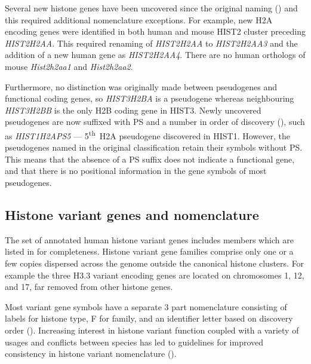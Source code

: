     Several new histone genes have been uncovered since the original
    naming ()
    and this required additional nomenclature exceptions.
    For example, new H2A encoding genes were identified in both human
    and mouse HIST2 cluster preceding \textit{HIST2H2AA}.
    This required renaming of \textit{HIST2H2AA} to \textit{HIST2H2AA3}
    and the addition of a new human gene as \textit{HIST2H2AA4}.
    There are no human orthologs of mouse \textit{Hist2h2aa1} and \textit{Hist2h2aa2}.

    Furthermore, no distinction was originally made between
    pseudogenes and functional coding genes,
    so \textit{HIST3H2BA} is a pseudogene whereas neighbouring
    \textit{HIST3H2BB} is the only H2B coding gene in HIST3.
    Newly uncovered pseudogenes are now suffixed with PS and a
    number in order of discovery (),
    such as \textit{HIST1H2APS5} --- 5\textsuperscript{th}~H2A pseudogene discovered in HIST1.
    However, the pseudogenes named in the original classification retain their symbols without PS.
    This means that the absence of a PS suffix does not indicate a functional gene,
    and that there is no positional information in the gene symbols of most pseudogenes.

  \subsection{Histone variant genes and nomenclature}
    The set of annotated human histone variant genes
    includes  members
    which are listed in  for completeness.
    Histone variant gene families comprise only one or a few copies
    dispersed across the genome outside the canonical histone clusters.
    For example the three H3.3 variant encoding genes are located
    on chromosomes 1, 12, and 17, far removed from other histone genes.

    Most variant gene symbols have a separate 3 part nomenclature
    consisting of labels for histone type, F for family,
    and an identifier letter based on discovery order ().
    Increasing interest in histone variant function \citep{MazeAllis2014}
    coupled with a variety of usages and conflicts between species
    has led to guidelines for improved consistency in histone variant nomenclature
    \citep{Talbert2012} ().
